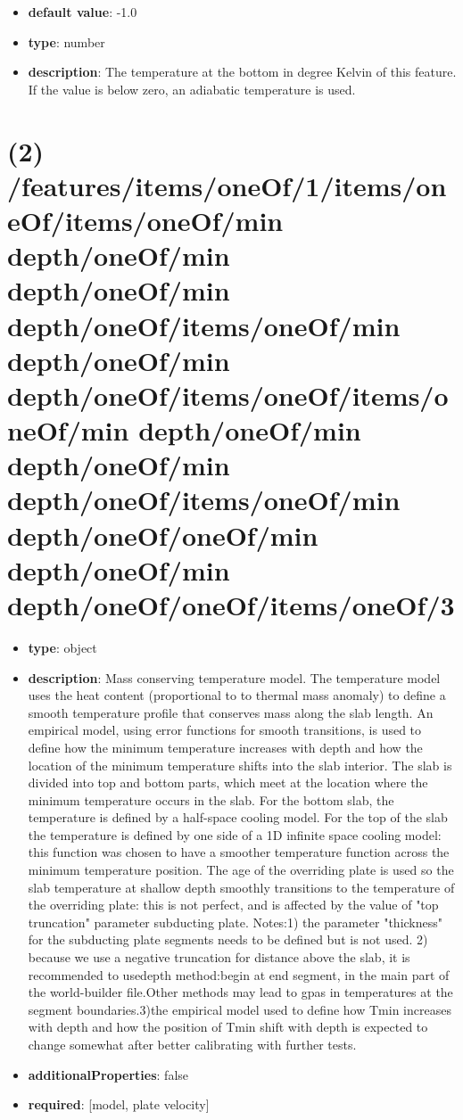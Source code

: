 \begin{itemize}[leftmargin=3em]\item {\bf default value}: -1.0
\item {\bf type}: number
\item {\bf description}: The temperature at the bottom in degree Kelvin of this feature. If the value is below zero, an adiabatic temperature is used.
\end{itemize}\section{(2) /features/items/oneOf/1/items/oneOf/items/oneOf/min depth/oneOf/min depth/oneOf/min depth/oneOf/items/oneOf/min depth/oneOf/min depth/oneOf/items/oneOf/items/oneOf/min depth/oneOf/min depth/oneOf/min depth/oneOf/items/oneOf/min depth/oneOf/oneOf/min depth/oneOf/min depth/oneOf/oneOf/items/oneOf/3}
\begin{itemize}[leftmargin=2em]\item {\bf type}: object
\item {\bf description}: Mass conserving temperature model. The temperature model uses the heat content (proportional to to thermal mass anomaly) to define a smooth temperature profile that conserves mass along the slab length. An empirical model, using error functions for smooth transitions, is used to  define how the minimum temperature increases with depth and how the location of the minimum temperature shifts into the slab interior. The slab is divided into top and bottom parts, which meet at the location where the minimum temperature occurs in the slab. For the bottom slab, the temperature is defined by a half-space cooling model. For the top of the slab the temperature is defined by one side of a 1D infinite space cooling model: this function was chosen to have a smoother temperature function across the minimum temperature position. The age of the overriding plate is used so the slab temperature at shallow depth smoothly transitions to the temperature of the overriding plate: this is not perfect, and is affected by the value of "top truncation" parameter subducting plate. Notes:1) the parameter "thickness" for the subducting plate segments needs to be defined but is not used. 2) because we use a negative truncation for distance above the slab, it is recommended to usedepth method:begin at end segment, in the main part of the world-builder file.Other methods may lead to gpas in temperatures at the segment boundaries.3)the empirical model used to define how Tmin increases with depth and how the position of Tmin shift with depth is expected to change somewhat after better calibrating with further tests.
\item {\bf additionalProperties}: false
\item {\bf required}: [model, plate velocity]\end{itemize}

